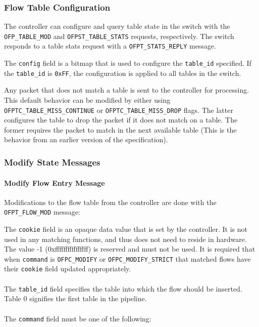 \subsubsection{Flow Table Configuration}
The controller can configure and query table state in the switch with the \verb|OFP_TABLE_MOD| and \verb|OFPST_TABLE_STATS| requests, respectively. The switch responds to a table stats request with a \verb|OFPT_STATS_REPLY| message.


The \verb|config| field is a bitmap that is used to configure the \verb|table_id| specified. If the \verb|table_id| is \verb|0xFF|, the configuration is applied to all tables in the switch.


Any packet that does not match a table is sent to the controller for processing. This default behavior can be modified by either using \verb|OFPTC_TABLE_MISS_CONTINUE| or \verb|OFPTC_TABLE_MISS_DROP| flags. The latter configures the table to drop the packet if it does not match on a table. The former requires the packet to match in the next available table (This is the behavior from an earlier version of the specification).

\subsubsection{Modify State Messages}
\paragraph{Modify Flow Entry Message}
Modifications to the flow table from the controller are done with the \verb|OFPT_FLOW_MOD| message:


The \verb|cookie| field is an opaque data value that is set by the
controller.  It is not used in any matching functions, and thus does not
need to reside in hardware.  The value -1 (0xffffffffffffffff) is
reserved and must not be used.  It is required that when \verb|command| is
\verb|OFPC_MODIFY| or \verb|OFPC_MODIFY_STRICT| that matched flows have
their \verb|cookie| field updated appropriately.
\\\\
The \verb|table_id| field specifies the table into which the flow should be inserted.
Table 0 signifies the first table in the pipeline.
\\\\
The \verb|command| field must be one of the following:

